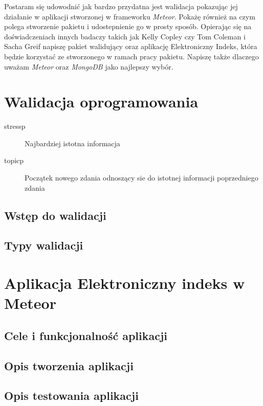 \documentclass[brudnopis]{xmgr}
\begin{document}
\textcolor{wa}{Postaram się udowodnić jak bardzo przydatna jest walidacja pokazując jej działanie w aplikacji
stworzonej w frameworku \textit{Meteor}. Pokażę również na czym polega stworzenie pakietu i udostepnienie
go w prosty sposób.} \textcolor{wd}{Opierając się na doświadczeniach innych badaczy takich jak Kelly Copley \cite{Mesosphere}
czy Tom Coleman i Sacha Greif \cite{DiscoverMeteor2013} napiszę pakiet walidujący oraz aplikację Elektroniczny Indeks,
która będzie korzystać ze stworzonego w ramach pracy pakietu.} \textcolor{wa}{Napiszę także dlaczego uważam \textit{Meteor} oraz \textit{MongoDB} jako najlepszy wybór.}




\chapter{Walidacja oprogramowania}

\begin{description}
\item[stressp] \textcolor{sa}{Najbardziej istotna informacja} 
\item[topicp] \textcolor{sb}{Początek nowego zdania odnoszący sie do istotnej informacji poprzedniego zdania}
\end{description}

\section{Wstęp do walidacji}
\cite{Validation}
\section{Typy walidacji}

\chapter{Aplikacja Elektroniczny indeks w Meteor}

\section{Cele i funkcjonalność aplikacji}
\section{Opis tworzenia aplikacji}
\cite{Introduction}
\cite{MeteorDocs}
\cite{DiscoverMeteor2013}
\cite{NodeDocs}
\cite{MongoDocs}
\cite{ScalingMongoDB2011}
\cite{ScalingWithMongoDB}
\section{Opis testowania aplikacji}
\cite{Laika}
\end{document}
